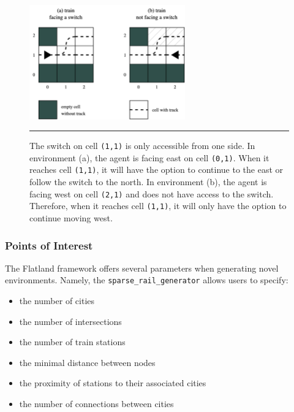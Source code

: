\documentclass[11pt]{article}
\newcommand{\code}[1]{\colorbox{light-gray}{\texttt{#1}}}
\begin{document}
\begin{figure}[t]
\centering
\includegraphics[width=0.60\textwidth]{transitions}
\caption{The switch on cell \texttt{(1,1)} is only accessible from one side.  In environment (a), the agent is facing east on cell \texttt{(0,1)}.  When it reaches cell \texttt{(1,1)}, it will have the option to continue to the east or follow the switch to the north.  In environment (b), the agent is facing west on cell \texttt{(2,1)} and does not have access to the switch.  Therefore, when it reaches cell \texttt{(1,1)}, it will only have the option to continue moving west.}

\begin{center}
{\color{lightgray} \rule{\linewidth}{0.15mm}}
\end{center}

\label{fig:transitions}
\end{figure}



\subsubsection{Points of Interest}
The Flatland framework offers several parameters when generating novel environments.  Namely, the \code{sparse\_rail\_generator} allows users to specify:
\begin{itemize}
	\item the number of cities
	\item the number of intersections
	\item the number of train stations
	\item the minimal distance between nodes
	\item the proximity of stations to their associated cities
	\item the number of connections between cities
\end {itemize}
\end{document}
